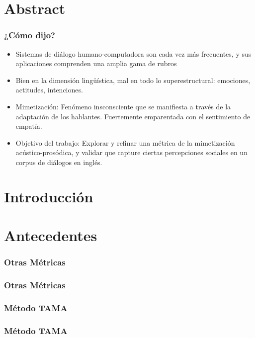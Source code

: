 \documentclass{beamer}
\title{\tituloTesis}
\author{Juan Manuel Pérez}
\begin{document}
\frame{\titlepage}


\section{Abstract}

\begin{frame}
  \frametitle{¿Cómo dijo?}


\begin{itemize}[<+->]
  \item Sistemas de diálogo humano-computadora son cada vez más frecuentes, y sus aplicaciones comprenden una amplia gama de rubros
  \item Bien en la dimensión lingüística, mal en todo lo superestructural: emociones, actitudes, intenciones.
  \item Mimetización: Fenómeno insconsciente que se manifiesta a través de la adaptación de los hablantes. Fuertemente emparentada con el sentimiento de empatía.
  \item Objetivo del trabajo: Explorar y refinar una métrica de la mimetización acústico-prosódica, y validar que capture ciertas percepciones sociales en un corpus de diálogos en inglés.
\end{itemize}

\end{frame}


\section{Introducción}



\section{Antecedentes}

\begin{frame}
  \frametitle{Otras Métricas}
\end{frame}

\begin{frame}
  \frametitle{Otras Métricas}
  \subtitle{Problemas}
\end{frame}



\begin{frame}
  \frametitle{Método TAMA}
\end{frame}


\begin{frame}
  \frametitle{Método TAMA}
  \subtitle{Ventajas}
\end{frame}
\end{document}
